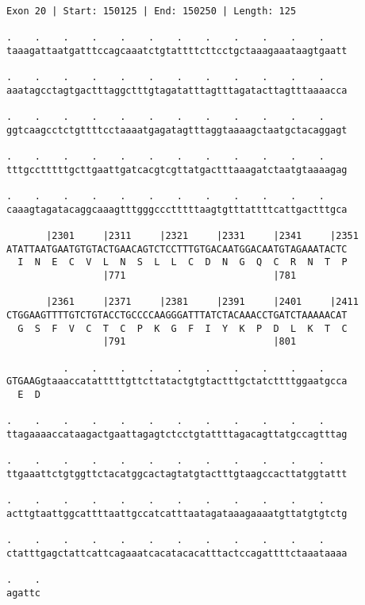 \documentclass{article}
\begin{document}
\begin{Verbatim}
Exon 20 | Start: 150125 | End: 150250 | Length: 125
 
.    .    .    .    .    .    .    .    .    .    .    .    
taaagattaatgatttccagcaaatctgtattttcttcctgctaaagaaataagtgaatt
  
.    .    .    .    .    .    .    .    .    .    .    .    
aaatagcctagtgactttaggctttgtagatatttagtttagatacttagtttaaaacca
  
.    .    .    .    .    .    .    .    .    .    .    .    
ggtcaagcctctgttttcctaaaatgagatagtttaggtaaaagctaatgctacaggagt
  
.    .    .    .    .    .    .    .    .    .    .    .    
tttgcctttttgcttgaattgatcacgtcgttatgactttaaagatctaatgtaaaagag
  
.    .    .    .    .    .    .    .    .    .    .    .    
caaagtagatacaggcaaagtttgggccctttttaagtgtttattttcattgactttgca
  
       |2301     |2311     |2321     |2331     |2341     |2351
ATATTAATGAATGTGTACTGAACAGTCTCCTTTGTGACAATGGACAATGTAGAAATACTC
  I  N  E  C  V  L  N  S  L  L  C  D  N  G  Q  C  R  N  T  P
                 |771                          |781         
  
       |2361     |2371     |2381     |2391     |2401     |2411
CTGGAAGTTTTGTCTGTACCTGCCCCAAGGGATTTATCTACAAACCTGATCTAAAAACAT
  G  S  F  V  C  T  C  P  K  G  F  I  Y  K  P  D  L  K  T  C
                 |791                          |801         
  
          .    .    .    .    .    .    .    .    .    .    
GTGAAGgtaaaccatatttttgttcttatactgtgtactttgctatcttttggaatgcca
  E  D                                                      
  
.    .    .    .    .    .    .    .    .    .    .    .    
ttagaaaaccataagactgaattagagtctcctgtattttagacagttatgccagtttag
  
.    .    .    .    .    .    .    .    .    .    .    .    
ttgaaattctgtggttctacatggcactagtatgtactttgtaagccacttatggtattt
  
.    .    .    .    .    .    .    .    .    .    .    .    
acttgtaattggcattttaattgccatcatttaatagataaagaaaatgttatgtgtctg
  
.    .    .    .    .    .    .    .    .    .    .    .    
ctatttgagctattcattcagaaatcacatacacatttactccagattttctaaataaaa
  
.    .
agattc
\end{Verbatim}
\newpage
\end{document}
